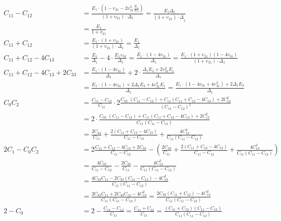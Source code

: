 \documentclass{article}
\begin{document}
\begin{align}
C_{11} - C_{12} &= \frac{E_{1} \cdot \left( 1 - \upsilon_{21} - 2\upsilon_{31}^{2}\frac{E_{1\ }}{E_{3}} \right)}{\left( 1 + \upsilon_{21} \right) \cdot \Delta_{1}} = \frac{E_{1}\Delta_{1}}{{\left( 1 + \upsilon_{21}^{} \right) \cdot \Delta}_{1}} \\ 
&= \frac{E_{1}}{1 + v_{21}}  \\
C_{11} + C_{12} &= \frac{E_{1} \cdot \left( 1 + \upsilon_{21} \right)}{\left( 1 + \upsilon_{21} \right) \cdot \Delta_{1}} = \frac{E_{1}}{\Delta_{1}}  \\
%
C_{11} + C_{12} - {4C}_{13} &= \frac{E_{1}}{\Delta_{1}} - 4 \cdot \frac{E_{1}\upsilon_{31}}{\Delta_{1}} = \frac{E_{1} \cdot (1 - 4v_{31})}{\Delta_{1}} = \frac{E_{1} \cdot \left( 1 + \upsilon_{21} \right)(1 - 4v_{31})}{\left( 1 + \upsilon_{21} \right) \cdot \Delta_{1}}  \\
%
C_{11} + C_{12} - {4C}_{13} + 2C_{33} &= \frac{E_{1} \cdot \left( 1 - 4v_{31} \right)}{\Delta_{1}} + 2 \cdot \frac{\Delta_{1}E_{3} + 2\upsilon_{31}^{2}E_{1}}{\Delta_{1}}  \\
&= \frac{E_{1} \cdot \left( 1 - 4v_{31} \right) + 2\Delta_{1}E_{3} + 4\upsilon_{31}^{2}E_{1}}{\Delta_{1}} = \frac{E_{1} \cdot \left( 1 - 4v_{31} + 4\upsilon_{31}^{2} \right) + 2\Delta_{1}E_{3}}{\Delta_{1}} \\
%
C_{0}C_{2} &= \frac{C_{11} - C_{12}}{C_{11}} \cdot 2\frac{C_{33\ \ }\left( C_{11} - C_{12} \right) + C_{11}\left( C_{11} + C_{12} - {4C}_{13} \right) + 2C_{13}^{2}}{\left( C_{11} - C_{12} \right)^{2}} \\ 
&= 2 \cdot \frac{C_{33\ \ }\left( C_{11} - C_{12} \right) + C_{11}\left( C_{11} + C_{12} - {4C}_{13} \right) + 2C_{13}^{2}}{C_{11}\left( C_{11} - C_{12} \right)} \\ 
&= \frac{2C_{33}}{C_{11}} + \frac{2\left( C_{11} + C_{12} - {4C}_{13} \right)}{C_{11} - C_{12}} + \frac{4C_{13}^{2}}{C_{11}\left( C_{11} - C_{12} \right)} \\
%
2C_{1} - C_{0}C_{2} &= 2\frac{C_{11} + C_{12} - {4C}_{13} + 2C_{33}}{C_{11} - C_{12}} - \left( \frac{2C_{33}}{C_{11}} + \frac{2\left( C_{11} + C_{12} - {4C}_{13} \right)}{C_{11} - C_{12}} + \frac{4C_{13}^{2}}{C_{11}\left( C_{11} - C_{12} \right)} \right) \\ 
&= \frac{4C_{33}}{C_{11} - C_{12}} - \frac{2C_{33}}{C_{11}} - \frac{4C_{13}^{2}}{C_{11}\left( C_{11} - C_{12} \right)} \\ 
&= \frac{4C_{33}C_{11} - 2C_{33}\left( C_{11} - C_{12} \right) - 4C_{13}^{2}}{C_{11}\left( C_{11} - C_{12} \right)} \\ 
&= \frac{2C_{33}C_{11} + 2C_{33}C_{12} - 4C_{13}^{2}}{C_{11}\left( C_{11} - C_{12} \right)} = \frac{2C_{33}\left( C_{11} + C_{12} \right) - 4C_{13}^{2}}{C_{11}\left( C_{11} - C_{12} \right)} \\
%
{2 - C}_{0} &= 2 - \frac{C_{11} - C_{12}}{C_{11}} = \frac{C_{11} + C_{12}}{C_{11}} = \frac{\left( C_{11} + C_{12} \right)\left( C_{11} - C_{12} \right)}{C_{11}\left( C_{11} - C_{12} \right)}
\end{align}
\end{document}
